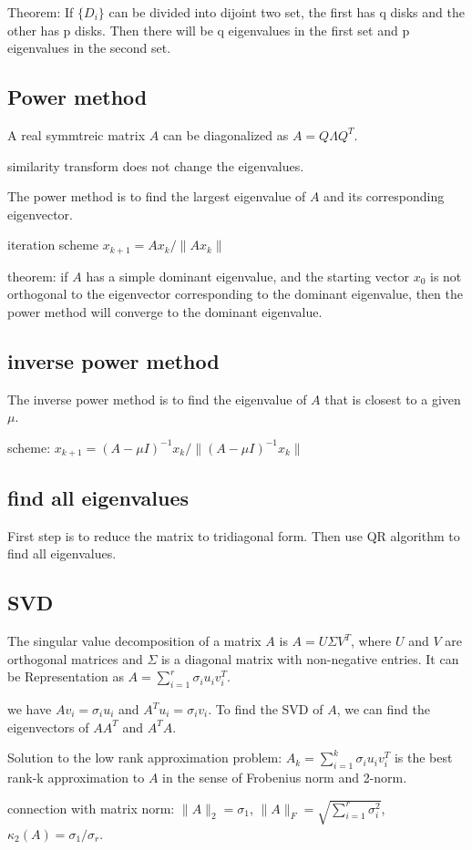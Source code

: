 \documentclass{article}%
\begin{document}
Theorem: If $\{D_i\}$ can be divided into dijoint two set, the first has q disks and the other has p disks. Then there will be q eigenvalues in the first set and p eigenvalues in the second set.


\subsection{Power method}
A real symmtreic matrix $A$ can be diagonalized as $A=Q\Lambda Q^T$. 

similarity transform does not change the eigenvalues.

The power method is to find the largest eigenvalue of $A$ and its corresponding eigenvector.

iteration scheme $x_{k+1}=Ax_k/\|Ax_k\|$

theorem: if $A$ has a simple dominant eigenvalue, and the starting vector $x_0$ is not orthogonal to the eigenvector corresponding to the dominant eigenvalue, then the power method will converge to the dominant eigenvalue.

\subsection{inverse power method}
The inverse power method is to find the eigenvalue of $A$ that is closest to a given $\mu$.

scheme: $x_{k+1}=(A-\mu I)^{-1}x_k/\|(A-\mu I)^{-1}x_k\|$

\subsection{find all eigenvalues}
First step is to reduce the matrix to tridiagonal form. Then use QR algorithm to find all eigenvalues.


\subsection{SVD}
The singular value decomposition of a matrix $A$ is $A=U\Sigma V^T$, where $U$ and $V$ are orthogonal matrices and $\Sigma$ is a diagonal matrix with non-negative entries. It can be Representation as $A=\sum_{i=1}^r \sigma_i u_i v_i^T$. 


we have $Av_i=\sigma_i u_i$ and $A^Tu_i=\sigma_i v_i$. To find the SVD of $A$, we can find the eigenvectors of $AA^T$ and $A^TA$.

Solution to the low rank approximation problem: $A_k=\sum_{i=1}^k \sigma_i u_i v_i^T$ is the best rank-k approximation to $A$ in the sense of Frobenius norm and 2-norm.

connection with matrix norm: $\|A\|_2=\sigma_1$, $\|A\|_F=\sqrt{\sum_{i=1}^r \sigma_i^2}$, $\kappa_2(A)=\sigma_1/\sigma_r$.
\end{document}
